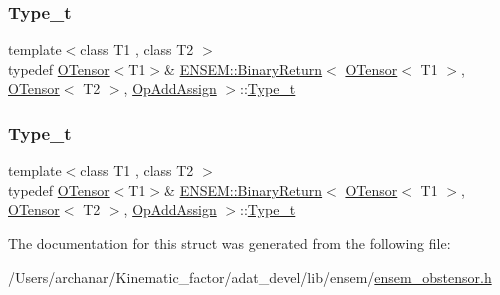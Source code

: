 \subsubsection{\texorpdfstring{Type\_t}{Type\_t}\hspace{0.1cm}{\footnotesize\ttfamily [1/2]}}
{\footnotesize\ttfamily template$<$class T1 , class T2 $>$ \\
typedef \mbox{\hyperlink{classENSEM_1_1OTensor}{O\+Tensor}}$<$T1$>$\& \mbox{\hyperlink{structENSEM_1_1BinaryReturn}{E\+N\+S\+E\+M\+::\+Binary\+Return}}$<$ \mbox{\hyperlink{classENSEM_1_1OTensor}{O\+Tensor}}$<$ T1 $>$, \mbox{\hyperlink{classENSEM_1_1OTensor}{O\+Tensor}}$<$ T2 $>$, \mbox{\hyperlink{structENSEM_1_1OpAddAssign}{Op\+Add\+Assign}} $>$\+::\mbox{\hyperlink{structENSEM_1_1BinaryReturn_3_01OTensor_3_01T1_01_4_00_01OTensor_3_01T2_01_4_00_01OpAddAssign_01_4_aed2beb3db4a1e722845946dc12345ba1}{Type\+\_\+t}}}

\mbox{\label{structENSEM_1_1BinaryReturn_3_01OTensor_3_01T1_01_4_00_01OTensor_3_01T2_01_4_00_01OpAddAssign_01_4_aed2beb3db4a1e722845946dc12345ba1}} 
\subsubsection{\texorpdfstring{Type\_t}{Type\_t}\hspace{0.1cm}{\footnotesize\ttfamily [2/2]}}
{\footnotesize\ttfamily template$<$class T1 , class T2 $>$ \\
typedef \mbox{\hyperlink{classENSEM_1_1OTensor}{O\+Tensor}}$<$T1$>$\& \mbox{\hyperlink{structENSEM_1_1BinaryReturn}{E\+N\+S\+E\+M\+::\+Binary\+Return}}$<$ \mbox{\hyperlink{classENSEM_1_1OTensor}{O\+Tensor}}$<$ T1 $>$, \mbox{\hyperlink{classENSEM_1_1OTensor}{O\+Tensor}}$<$ T2 $>$, \mbox{\hyperlink{structENSEM_1_1OpAddAssign}{Op\+Add\+Assign}} $>$\+::\mbox{\hyperlink{structENSEM_1_1BinaryReturn_3_01OTensor_3_01T1_01_4_00_01OTensor_3_01T2_01_4_00_01OpAddAssign_01_4_aed2beb3db4a1e722845946dc12345ba1}{Type\+\_\+t}}}



The documentation for this struct was generated from the following file\+:\begin{DoxyCompactItemize}
\item 
/\+Users/archanar/\+Kinematic\+\_\+factor/adat\+\_\+devel/lib/ensem/\mbox{\hyperlink{lib_2ensem_2ensem__obstensor_8h}{ensem\+\_\+obstensor.\+h}}\end{DoxyCompactItemize}
